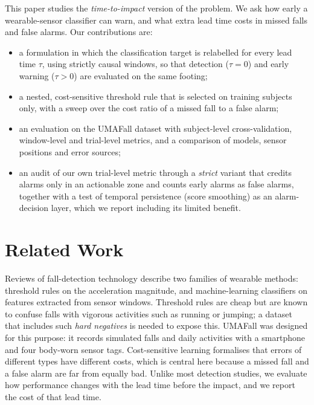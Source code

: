 \documentclass[conference]{IEEEtran}
\begin{document}
This paper studies the \emph{time-to-impact} version of the problem. We ask how early a wearable-sensor classifier can warn, and what extra lead time costs in missed falls and false alarms. Our contributions are:
\begin{itemize}
\item a formulation in which the classification target is relabelled for every lead time $\tau$, using strictly causal windows, so that detection ($\tau=0$) and early warning ($\tau>0$) are evaluated on the same footing;
\item a nested, cost-sensitive threshold rule that is selected on training subjects only, with a sweep over the cost ratio of a missed fall to a false alarm;
\item an evaluation on the UMAFall dataset with subject-level cross-validation, window-level and trial-level metrics, and a comparison of models, sensor positions and error sources;
\item an audit of our own trial-level metric through a \emph{strict} variant that credits alarms only in an actionable zone and counts early alarms as false alarms, together with a test of temporal persistence (score smoothing) as an alarm-decision layer, which we report including its limited benefit.
\end{itemize}

\section{Related Work}
Reviews of fall-detection technology \cite{noury2007,igual2013} describe two families of wearable methods: threshold rules on the acceleration magnitude, and machine-learning classifiers on features extracted from sensor windows. Threshold rules are cheap but are known to confuse falls with vigorous activities such as running or jumping; a dataset that includes such \emph{hard negatives} is needed to expose this. UMAFall \cite{casilari2017} was designed for this purpose: it records simulated falls and daily activities with a smartphone and four body-worn sensor tags. Cost-sensitive learning \cite{elkan2001} formalises that errors of different types have different costs, which is central here because a missed fall and a false alarm are far from equally bad. Unlike most detection studies, we evaluate how performance changes with the lead time before the impact, and we report the cost of that lead time.
\end{document}
